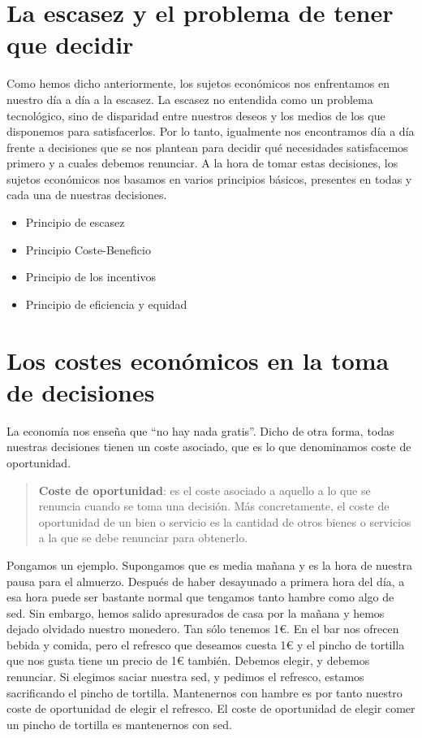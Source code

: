\documentclass[
]{krantz}
\providecommand{\tightlist}{%
  \setlength{\itemsep}{0pt}\setlength{\parskip}{0pt}}
\begin{document}
\hypertarget{la-escasez-y-el-problema-de-tener-que-decidir}{%
\section{La escasez y el problema de tener que decidir}\label{la-escasez-y-el-problema-de-tener-que-decidir}}

Como hemos dicho anteriormente, los sujetos económicos nos enfrentamos en nuestro día a día a la escasez. La escasez no entendida como un problema tecnológico, sino de disparidad
entre nuestros deseos y los medios de los que disponemos para satisfacerlos.
Por lo tanto, igualmente nos encontramos día a día frente a decisiones que se nos plantean para decidir qué necesidades satisfacemos primero y a cuales debemos renunciar. A la hora de tomar estas decisiones, los sujetos económicos nos basamos en varios principios básicos, presentes en todas y cada una de nuestras decisiones.

\begin{itemize}
\tightlist
\item
  Principio de escasez
\item
  Principio Coste-Beneficio
\item
  Principio de los incentivos
\item
  Principio de eficiencia y equidad
\end{itemize}

\hypertarget{los-costes-econuxf3micos-en-la-toma-de-decisiones}{%
\section{Los costes económicos en la toma de decisiones}\label{los-costes-econuxf3micos-en-la-toma-de-decisiones}}

La economía nos enseña que ``no hay nada gratis''. Dicho de otra forma, todas nuestras decisiones tienen un coste asociado, que es lo que denominamos coste de oportunidad.

\begin{quote}
\textbf{Coste de oportunidad}: es el coste asociado a aquello a lo que se renuncia cuando se toma una decisión. Más concretamente, el coste de oportunidad de un bien o servicio es la cantidad de otros bienes o servicios a la que se debe renunciar para obtenerlo.
\end{quote}

Pongamos un ejemplo. Supongamos que es media mañana y es la hora de nuestra pausa para el almuerzo. Después de haber desayunado a primera hora del día, a esa hora puede ser bastante normal que tengamos tanto hambre como algo de sed. Sin embargo, hemos salido apresurados de casa por la mañana y hemos dejado olvidado nuestro monedero. Tan sólo tenemos 1€.
En el bar nos ofrecen bebida y comida, pero el refresco que deseamos cuesta 1€ y el pincho de tortilla que nos gusta tiene un precio de 1€ también. Debemos elegir, y debemos renunciar. Si elegimos saciar nuestra sed, y pedimos el refresco, estamos sacrificando el pincho de tortilla. Mantenernos con hambre es por tanto nuestro coste de oportunidad de elegir el refresco. El coste de oportunidad de elegir comer un pincho de tortilla es mantenernos con sed.
\end{document}
